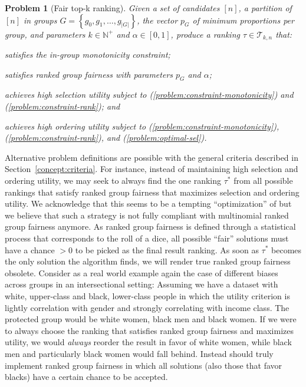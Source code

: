 \newtheorem*{problem*}{Problem}
\begin{problem*}[Fair top-k ranking]
	Given a set of candidates $[n]$, \textcolor[rgb]{0.00,0.00,1.00}{a partition of $[n]$ in groups $G = \left\{g_0, g_1, \ldots, g_{|G|}\right\}$, the vector $p_G$ of minimum proportions per group,  and parameters $k \in \mathbb{N}^+$ and $\alpha \in [0,1]$}, produce a ranking $\tau \in {\mathcal T}_{k,n}$ that:
	\begin{compactenum}[(i)]
		\item \label{problem:constraint-monotonicity} satisfies the in-group monotonicity constraint;
		\item \label{problem:constraint-rank} satisfies ranked group fairness with parameters $p_G$ and $\alpha$;
		\item \label{problem:optimal-sel} achieves high selection utility subject to (\ref{problem:constraint-monotonicity}) and (\ref{problem:constraint-rank}); and
		\item \label{problem:maximum-ord} achieves high ordering utility subject to (\ref{problem:constraint-monotonicity}), (\ref{problem:constraint-rank}), and (\ref{problem:optimal-sel}).
	\end{compactenum}
\end{problem*}

\label{concept:related-problems}
%
Alternative problem definitions are possible with the general criteria described in Section~\ref{concept:criteria}.
%
For instance, instead of maintaining high selection and ordering utility, we may seek to always find the one ranking $\tau^*$ from all possible rankings that satisfy ranked group fairness that maximizes selection and ordering utility.
%
We acknowledge that this seems to be a tempting ``optimization'' of \algoFAIR but we believe that such a strategy is not fully compliant with multinomial ranked group fairness anymore.
%
As ranked group fairness is defined through a statistical process that corresponds to the roll of a dice, all possible ``fair'' solutions must have a chance $>0$ to be picked as the final result ranking.
%
As soon as $\tau^*$ becomes the only solution the algorithm finds, we will render true ranked group fairness obsolete.
%
Consider as a real world example again the case of different biases across groups in an intersectional setting:
%
Assuming we have a dataset with white, upper-class and black, lower-class people in which the utility criterion is lightly correlation with gender and strongly correlating with income class.
%
The protected group would be white women, black men and black women.
%
If we were to always choose the ranking that satisfies ranked group fairness and maximizes utility, we would \emph{always} reorder the result in favor of white women, while black men and particularly black women would fall behind.
%
Instead \algoFAIR should truly implement ranked group fairness in which all solutions (also those that favor blacks) have a certain chance to be accepted.
